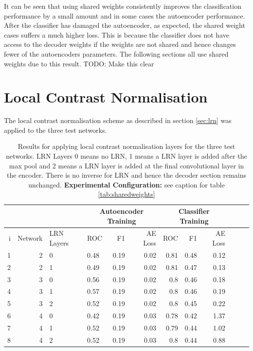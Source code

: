       It can be seen that using shared weights consistently improves the classification
      performance by a small amount and in some cases the autoencoder performance. After the classifier has
      damaged the autoencoder, as expected, the shared weight cases suffers a much higher loss. This is
      because the classifier does not have access to the decoder weights if the weights are not shared and hence
      changes fewer of the autoencoders parameters. The following sections all use shared weights due to this result.
      {\color{red}TODO: Make this clear}
    \newpage
    \section{Local Contrast Normalisation}

      The local contrast normalisation scheme as described in section \ref{sec:lrn}
      was applied to the three test networks.

      \begin{table}[!h] \centering
        \footnotesize{
        \begin{tabular}{rrllrrrrrrrr}
          &&&   \multicolumn{3}{|c|}{Autoencoder Training} &  \multicolumn{3}{c|}{Classifier Training}    \\
        \hline
          i & Network             & LRN Layers   &    ROC&F1&AE Loss & ROC & F1 & AE Loss \\
        \hline
         1 & 2 & 0  &    0.48 &   0.19 &     0.02 &    0.81 &   0.48 &     0.12 \\
         2 & 2 & 1  &    0.49 &   0.19 &     0.02 &    0.81 &   0.47 &     0.13 \\
        \hline
         3 & 3 & 0  &    0.56 &   0.19 &     0.02 &    0.8  &   0.46 &     0.18 \\
         4 & 3 & 1  &    0.57 &   0.19 &     0.02 &    0.8  &   0.46 &     0.19 \\
         5 & 3 & 2  &    0.52 &   0.19 &     0.02 &    0.8  &   0.45 &     0.22 \\
        \hline
         6 & 4 & 0  &    0.42 &   0.19 &     0.03 &    0.78 &   0.42 &     1.37 \\
         7 & 4 & 1  &    0.52 &   0.19 &     0.03 &    0.79 &   0.44 &     1.02 \\
         8 & 4 & 2  &    0.52 &   0.19 &     0.03 &    0.8  &   0.44 &     0.88 \\
        \hline
        \end{tabular}}

        \caption{Results for applying local contrast normalisation layers
        for the three test networks. LRN Layers 0 means no LRN, 1 means a LRN layer is added after the max pool
        and 2 means a LRN layer is added at the final convolutional layer in the encoder. There is no
        inverse for LRN and hence the decoder section remains unchanged. {\bf Experimental Configuration:} see caption
        for table \ref{tab:sharedweights}
        }
        \label{tab:lrn}
      \end{table}


